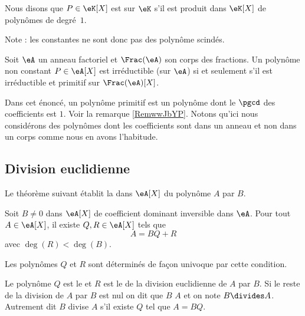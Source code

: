 \begin{definition}  \label{DefCPLSooQaHJKQ}
    Nous disons que \( P\in\eK[X]\) est  sur \(\eK\) s'il est produit dans \(\eK[X]\) de polynômes de degré~\( 1\). 
\end{definition}
Note : les constantes ne sont donc pas des polynôme scindés.

\begin{theorem}     \label{ThofiIpXg} 
    Soit \( \eA\) un anneau factoriel et \( \Frac(\eA)\) son corps des fractions. Un polynôme non constant \( P\in \eA[X]\) est irréductible (sur \( \eA\)) si et seulement s'il est irréductible et primitif sur \( \Frac(\eA)[X]\). 
\end{theorem}

Dans cet énoncé, un polynôme primitif est un polynôme dont le \( \pgcd\) des coefficients est \( 1\). Voir la remarque \ref{RemwwJbYP}. Notons qu'ici nous considérons des polynômes dont les coefficients sont dans un anneau et non dans un corps comme nous en avons l'habitude.

\subsection{Division euclidienne}

Le théorème suivant établit la  dans \( \eA[X]\) du polynôme \( A\) par \( B\).
\begin{theorem}     \label{ThodivEuclPsFexf}
    Soit \( B\neq 0\) dans \( \eA[X]\) de coefficient dominant inversible dans \( \eA\). Pour tout \( A\in\eA[X]\), il existe \( Q,R\in \eA[X]\) tels que
    \begin{equation}
        A=BQ+R
    \end{equation}
    avec \( \deg(R)<\deg(B)\).

    Les polynômes \( Q\) et \( R\) sont déterminés de façon univoque par cette condition. 
    
\end{theorem}

\begin{definition}\label{DefMPZooMmMymG}
    Le polynôme \( Q\) est le  et \( R\) est le  de la division euclidienne de \( A\) par \( B\). Si le reste de la division de \( A\) par $B$ est nul on dit que \( B\)  \( A\) et on note \( B\divides A\). Autrement dit \( B\) divise \( A\) s'il existe \( Q\) tel que \( A=BQ\).
\end{definition}

